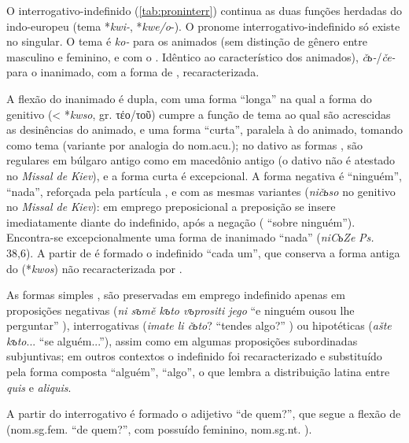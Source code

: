O interrogativo-indefinido (\autoref{tab:proninterr}) continua as duas funções
herdadas
do indo-europeu (tema *\emph{kwi-}, *\emph{kwe/o}-). O pronome
interrogativo-indefinido só existe no singular. O tema é \emph{ko-} para
os animados (sem distinção de gênero entre masculino e feminino, e com o
. Idêntico ao  característico dos animados),
\emph{čь-}/\emph{če-} para o inanimado, com a forma de 
,  recaracterizada.



A flexão do inanimado é dupla, com uma forma ``longa'' na qual a forma
do genitivo  (< *\emph{kwso}, gr. τέο/τοῦ) cumpre
a função de tema ao qual são acrescidas as desinências do animado, e uma
forma ``curta'', paralela à do animado, tomando como tema 
(variante  por analogia do nom.acu.); no dativo as formas
,  são regulares em búlgaro antigo
como em macedônio antigo (o dativo não é atestado no \emph{Missal de
Kiev}), e a forma curta  é excepcional. A forma negativa
é  ``ninguém'',  ``nada'',
reforçada pela partícula , e com as mesmas variantes
(\emph{ničьso} no genitivo no \emph{Missal de Kiev}): em emprego
preposicional a preposição se insere imediatamente diante do indefinido,
após a negação  ( ``sobre
ninguém''). Encontra-se excepcionalmente uma forma de inanimado
 ``nada'' (\emph{niCьZe} \emph{Ps.} 38,6). A partir de
 é formado o indefinido  ``cada um'', que conserva a
forma antiga do   (*\emph{kwos}) não recaracterizada
por .

As formas simples ,  são preservadas em
emprego indefinido apenas em proposições negativas (\emph{ni sъmě kъto
vъprositi jego} ``e ninguém ousou lhe perguntar'' ),
interrogativas (\emph{imate li čьto}? ``tendes algo?'' ) ou
hipotéticas (\emph{ašte kъto}... ``se alguém...''), assim como em
algumas proposições subordinadas subjuntivas; em outros contextos o
indefinido foi recaracterizado e substituído pela forma composta
 ``alguém'',  ``algo'', o que lembra a
distribuição latina entre \emph{quis} e \emph{aliquis}.

A partir do interrogativo é formado o adijetivo  ``de
quem?'', que segue a flexão de  (nom.sg.fem.
 ``de quem?'', com possuído feminino, nom.sg.nt.
).

